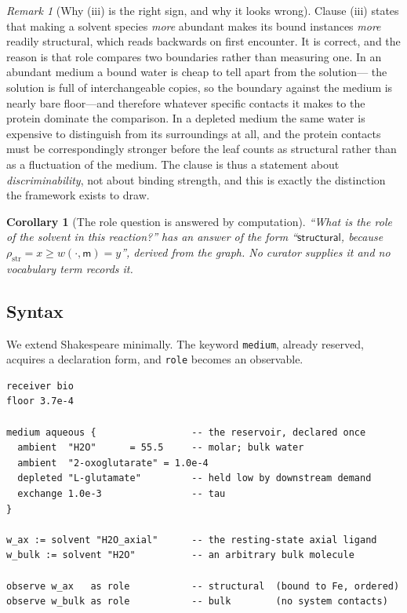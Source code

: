 \documentclass[11pt,twocolumn,a4paper]{article}
\theoremstyle{thmstyle}
\newtheorem{corollary}[theorem]{Corollary}
\theoremstyle{definition}
\theoremstyle{remark}
\newtheorem{remark}[theorem]{Remark}
\newcommand{\res}{\rho}
\newcommand{\med}{\mathsf{m}}
\newcommand{\shk}[1]{\texttt{#1}}
\newcommand{\Str}{\textsf{structural}}
\begin{document}
\begin{remark}[Why (iii) is the right sign, and why it looks wrong]
\label{rem:monotone-sign}
Clause (iii) states that making a solvent species \emph{more} abundant
makes its bound instances \emph{more} readily structural, which reads
backwards on first encounter. It is correct, and the reason is that
$\mathrm{role}$ compares two boundaries rather than measuring one. In an
abundant medium a bound water is cheap to tell apart from the solution---
the solution is full of interchangeable copies, so the boundary against
the medium is nearly bare floor---and therefore whatever specific
contacts it makes to the protein dominate the comparison. In a depleted
medium the same water is expensive to distinguish from its surroundings
at all, and the protein contacts must be correspondingly stronger before
the leaf counts as structural rather than as a fluctuation of the medium.
The clause is thus a statement about \emph{discriminability}, not about
binding strength, and this is exactly the distinction the framework
exists to draw.
\end{remark}

\begin{corollary}[The role question is answered by computation]
\label{cor:role-answered}
``What is the role of the solvent in this reaction?'' has an answer of the
form ``$\Str$, because $\res_{\mathrm{str}}=x \ge w(\cdot,\med)=y$'',
derived from the graph. No curator supplies it and no vocabulary term
records it.
\end{corollary}

\subsection{Syntax}

We extend Shakespeare minimally. The keyword \shk{medium}, already
reserved, acquires a declaration form, and \shk{role} becomes an
observable.

\begin{lstlisting}[caption={Medium declaration and derived solvent role.}]
receiver bio
floor 3.7e-4

medium aqueous {                 -- the reservoir, declared once
  ambient  "H2O"      = 55.5     -- molar; bulk water
  ambient  "2-oxoglutarate" = 1.0e-4
  depleted "L-glutamate"         -- held low by downstream demand
  exchange 1.0e-3                -- tau
}

w_ax := solvent "H2O_axial"      -- the resting-state axial ligand
w_bulk := solvent "H2O"          -- an arbitrary bulk molecule

observe w_ax   as role           -- structural  (bound to Fe, ordered)
observe w_bulk as role           -- bulk        (no system contacts)
\end{lstlisting}
\end{document}
